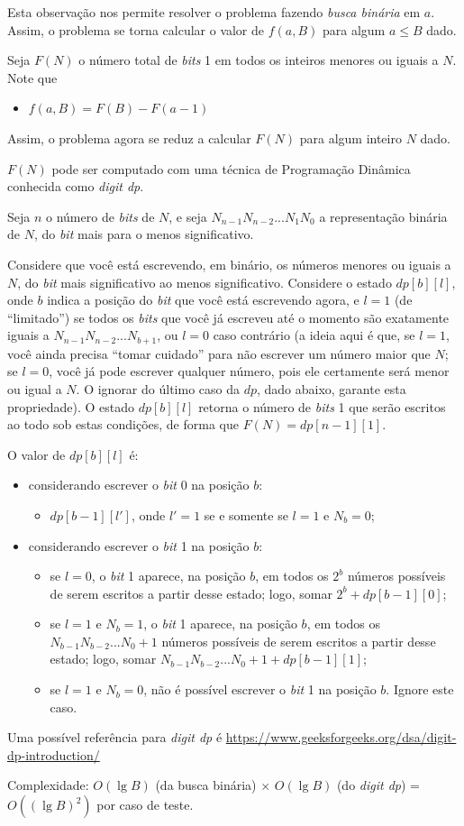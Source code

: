 Esta observação nos permite resolver o problema fazendo \textit{busca binária} em $a$.
Assim, o problema se torna calcular o valor de $f(a,B)$ para
algum $a \leq B$ dado.

Seja $F(N)$ o número total de \textit{bits} 1 em todos os inteiros
menores ou iguais a $N$. Note que
\begin{itemize}
    \item $f(a,B) = F(B) - F(a-1)$
\end{itemize}

Assim, o problema agora se reduz a calcular $F(N)$ para algum inteiro $N$ dado.

$F(N)$ pode ser computado com uma técnica de Programação Dinâmica conhecida como
\textit{digit dp}.

Seja $n$ o número de \textit{bits} de $N$, e seja $N_{n-1}N_{n-2}...N_1N_0$ a
representação binária de $N$, do \textit{bit} mais para o menos significativo.

Considere que você está escrevendo, em binário, os números menores ou iguais a
$N$, do \textit{bit} mais significativo ao menos significativo. Considere o estado
$dp[b][l]$, onde $b$ indica a posição do \textit{bit} que você está escrevendo
agora, e
$l=1$ (de
``limitado'') se todos os \textit{bits} que você já escreveu até o
momento são exatamente iguais a $N_{n-1}N_{n-2}...N_{b+1}$, ou $l=0$ caso contrário
(a ideia aqui é que, se $l=1$, você ainda precisa ``tomar cuidado'' para não
 escrever um número maior que $N$; se $l=0$, você já pode escrever qualquer
 número, pois ele certamente será menor ou igual a $N$. O ignorar do último caso
 da $dp$, dado abaixo, garante esta propriedade).
O estado $dp[b][l]$ retorna o número de \textit{bits} 1 que serão escritos ao
todo sob estas condições, de forma que $F(N) = dp[n-1][1]$.

O valor de $dp[b][l]$ é:
\begin{itemize}
    \item considerando escrever o \textit{bit} 0 na posição $b$:
    \begin{itemize}
        \item[$\rightarrow$] $dp[b-1][l']$, onde $l' = 1$ se e somente se $l = 1$ e $N_b = 0$;
    \end{itemize}
    \item considerando escrever o \textit{bit} 1 na posição $b$:
    \begin{itemize}
        \item[$\rightarrow$] se $l=0$, o \textit{bit} 1 aparece, na posição $b$, em todos os $2^b$ números
        possíveis de serem escritos a partir desse estado; logo, somar
        $2^b + dp[b-1][0]$;
        \item[$\rightarrow$] se $l=1$ e $N_b = 1$, o \textit{bit} 1 aparece, na posição $b$, em
        todos os $N_{b-1}N_{b-2}...N_0 + 1$ números possíveis de serem escritos a
        partir desse estado; logo, somar
        $N_{b-1}N_{b-2}...N_0 + 1 + dp[b-1][1]$;
        \item[$\rightarrow$] se $l=1$ e $N_b = 0$, não é possível escrever o \textit{bit} 1 na
        posição $b$. Ignore este caso.
    \end{itemize}
\end{itemize}

Uma possível referência para \textit{digit dp} é \url{https://www.geeksforgeeks.org/dsa/digit-dp-introduction/}

Complexidade: $O(\lg B)$ (da busca binária) $\times$ $O(\lg B)$ (do
        \textit{digit dp}) = $O((\lg B)^2)$ por caso de teste.

